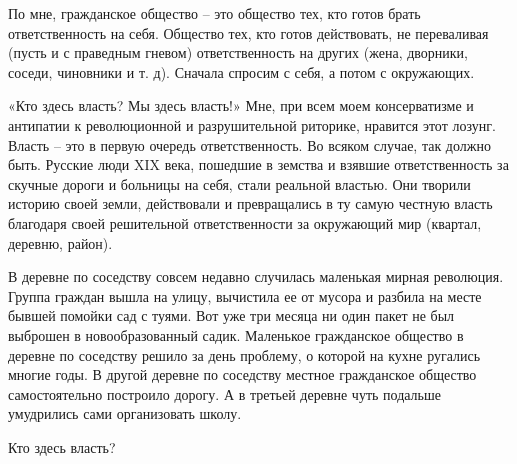 По мне, гражданское общество – это общество тех, кто готов брать
ответственность на себя. Общество тех, кто готов действовать, не переваливая
(пусть и с праведным гневом) ответственность на других (жена, дворники, соседи,
чиновники и т. д). Сначала спросим с себя, а потом с окружающих.

«Кто здесь власть? Мы здесь власть!» Мне, при всем моем консерватизме и
антипатии к революционной и разрушительной риторике, нравится этот лозунг.
Власть – это в первую очередь ответственность. Во всяком случае, так должно
быть. Русские люди XIX века, пошедшие в земства и взявшие ответственность за
скучные дороги и больницы на себя, стали реальной властью. Они творили историю
своей земли, действовали и превращались в ту самую честную власть благодаря
своей решительной ответственности за окружающий мир (квартал, деревню, район).

В деревне по соседству совсем недавно случилась маленькая мирная революция.
Группа граждан вышла на улицу, вычистила ее от мусора и разбила на месте бывшей
помойки сад с туями. Вот уже три месяца ни один пакет не был выброшен в
новообразованный садик. Маленькое гражданское общество в деревне по соседству
решило за день проблему, о которой на кухне ругались многие годы. В другой
деревне по соседству местное гражданское общество самостоятельно построило
дорогу. А в третьей деревне чуть подальше умудрились сами организовать школу.

Кто здесь власть?


